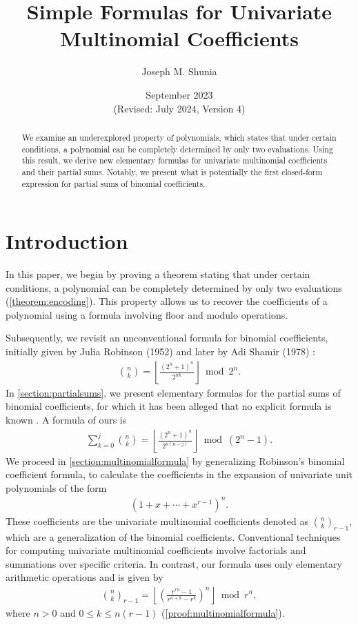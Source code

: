 \documentclass{article}
\title{Simple Formulas for Univariate Multinomial Coefficients}
\author{Joseph M. Shunia}
\date{September 2023 \\ \small (Revised: July 2024, Version 4) \normalsize}
\theoremstyle{plain}
\theoremstyle{definition}
\newcommand{\floor}[1]{\left\lfloor #1 \right\rfloor}
\begin{document}
\maketitle

\begin{abstract}
We examine an underexplored property of polynomials, which states that under certain conditions, a polynomial can be completely determined by only two evaluations. Using this result, we derive new elementary formulas for univariate multinomial coefficients and their partial sums. Notably, we present what is potentially the first closed-form expression for partial sums of binomial coefficients.
\end{abstract}

\section{Introduction}
In this paper, we begin by proving a theorem stating that under certain conditions, a polynomial can be completely determined by only two evaluations (\cref{theorem:encoding}). This property allows us to recover the coefficients of a polynomial using a formula involving floor and modulo operations.

Subsequently, we revisit an unconventional formula for binomial coefficients, initially given by Julia Robinson (1952) \cite{robinson1952arithmetic} and later by Adi Shamir (1978) \cite{shamir1978factoring}:
\begin{align*}
\binom{n}{k} = \left\lfloor\frac{(2^n+1)^n}{2^{n k}}\right\rfloor \bmod{2^{n}} .
\end{align*}
In \cref{section:partialsums}, we present elementary formulas for the partial sums of binomial coefficients, for which it has been alleged that no explicit formula is known \cite{boardman2004eggdropnumbers, wikipedia2024binomialcoefficient}. A formula of ours is
\begin{align*}
\sum_{k=0}^{j} \binom{n}{k}
= \floor{\frac{(2^n+1)^n}{2^{n(n-j)}}} \bmod (2^n-1) .
\end{align*}
We proceed in \cref{section:multinomialformula} by generalizing Robinson's binomial coefficient formula, to calculate the coefficients in the expansion of univariate unit polynomials of the form
\begin{align*}
 [x^k](1 + x + \cdots + x^{r-1})^n .
\end{align*}
These coefficients are the univariate multinomial coefficients denoted as $\binom{n}{k}_{r-1}$, which are a generalization of the binomial coefficients. Conventional techniques for computing univariate multinomial coefficients involve factorials and summations over specific criteria. In contrast, our formula uses only elementary arithmetic operations and is given by
\begin{align*}
    \binom{n}{k}_{r-1} = \left\lfloor\left(\frac{r^{rn} - 1}{r^{n+k} - r^k}\right)^n\right\rfloor \bmod r^n ,
\end{align*}
where $n > 0$ and $0 \leq k \leq n (r-1)$ (\cref{proof:multinomialformula}).
\end{document}

